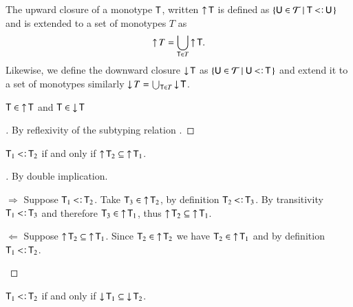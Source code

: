 \documentclass{report}
\begin{document}
  \begin{dfn}
    The upward closure of a monotype $\textsf{T}$, written $\mathop{\rm\uparrow}\nolimits\textsf{T}$
    is defined as $\coll{\type{U}\in\Types}{\type{T}\subtype\type{U}}$ and is extended to a set of
    monotypes $T$ as
    \begin{displaymath}
      \mathop{\rm\uparrow}\nolimits T=\bigcup_{\textsf{T}\in T}\mathop{\rm\uparrow}\nolimits\textsf{T}\textrm{.}
    \end{displaymath}
    Likewise, we define the downward closure $\mathop{\rm\downarrow}\nolimits\textsf{T}$
    as $\coll{\type{U}\in\Types}{\type{U}\subtype\type{T}}$
    and extend it to a set of monotypes similarly
    $\mathop{\rm\downarrow}\nolimits T=\bigcup_{\textsf{T}\in T}\mathop{\rm\downarrow}\nolimits\textsf{T}$.
  \end{dfn}
  \begin{lemma}
    $\textsf{T}\in\mathop{\rm\uparrow}\nolimits\textsf{T}$ and $\textsf{T}\in\mathop{\rm\downarrow}\nolimits\textsf{T}$
  \end{lemma}
  \begin{proof}[]
    By reflexivity of the subtyping relation .
  \end{proof}
  \begin{thm}
    $\type{T}_1\subtype\type{T}_2$ if and only if
    $\mathop{\rm\uparrow}\nolimits\textsf{T}_2\subseteq\mathop{\rm\uparrow}\nolimits\textsf{T}_1$.
  \end{thm}
  \begin{proof}[]
    By double implication.
    \begin{indcase}{$\Rightarrow$}
      Suppose $\type{T}_1\subtype\type{T}_2$.
      Take $\textsf{T}_3\in\mathop{\rm\uparrow}\nolimits\textsf{T}_2$, by definition $\type{T}_2\subtype\type{T}_3$.
      By transitivity  $\type{T}_1\subtype\type{T}_3$ and
      therefore $\textsf{T}_3\in\mathop{\rm\uparrow}\nolimits\textsf{T}_1$,
      thus $\mathop{\rm\uparrow}\nolimits\textsf{T}_2\subseteq\mathop{\rm\uparrow}\nolimits\textsf{T}_1$.
    \end{indcase}
    \begin{indcase}{$\Leftarrow$}
      Suppose $\mathop{\rm\uparrow}\nolimits\textsf{T}_2\subseteq\mathop{\rm\uparrow}\nolimits\textsf{T}_1$. Since
      $\textsf{T}_2\in\mathop{\rm\uparrow}\nolimits\textsf{T}_2$  we have
      $\textsf{T}_2\in\mathop{\rm\uparrow}\nolimits\textsf{T}_1$ and by definition $\type{T}_1\subtype\type{T}_2$.
    \end{indcase}
  \end{proof}
  \begin{thm}
    $\type{T}_1\subtype\type{T}_2$ if and only if
    $\mathop{\rm\downarrow}\nolimits\textsf{T}_1\subseteq\mathop{\rm\downarrow}\nolimits\textsf{T}_2$.
  \end{thm}
\end{document}
